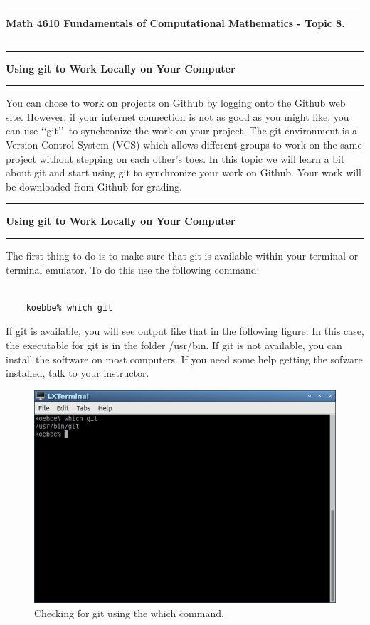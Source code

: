 \documentclass[10pt,fleqn]{article}
\begin{document}
\vskip0.1in\hrule\vskip0.1in \noindent
{\bf Math 4610 Fundamentals of Computational Mathematics  - Topic 8.}
\vskip0.1in\hrule\vskip0.1in \noindent
\vskip0.1in\hrule\vskip0.1in\noindent\noindent
{\bf Using git to Work Locally on Your Computer} 
\vskip0.1in\hrule\vskip0.1in\noindent
You can chose to work on projects on Github by logging onto the Github web site.
However, if your internet connection is not as good as you might like, you can
use \lq\lq git\rq\rq\ to synchronize the work on your project. The git
environment is a Version Control System (VCS) which allows different groups to
work on the same project without stepping on each other's toes. In this topic
we will learn a bit about git and start using git to synchronize your work on
Github. Your work will be downloaded from Github for grading. 
\vskip0.1in\hrule\vskip0.1in\noindent\noindent
{\bf Using git to Work Locally on Your Computer} 
\vskip0.1in\hrule\vskip0.1in\noindent
The first thing to do is to make sure that git is available within your terminal
or terminal emulator. To do this use the following command:
\begin{verbatim}

    koebbe% which git

\end{verbatim}
If git is available, you will see output like that in the following figure. In
this case, the executable for git is in the folder /usr/bin. If git is not
available, you can install the software on most computers. If you need some help
getting the sofware installed, talk to your instructor.
\vfill
\begin{figure}[h]
\centering
\includegraphics{../images/git_01.png}
\vskip0.1in
\caption{Checking for git using the which command.}
\end{figure}
\end{document}
